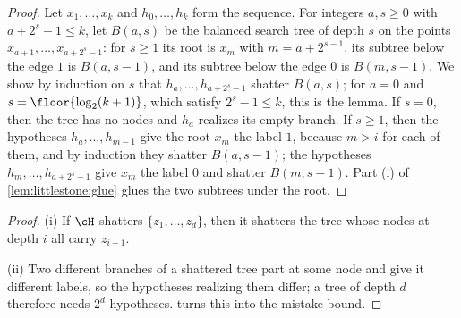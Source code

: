 \begin{refsection}

\begin{proof}
Let $x_1,\dots,x_k$ and $h_0,\dots,h_k$ form the sequence. For integers $a,s\ge0$ with $a+2^s-1\le k$, let $B(a,s)$ be the balanced search tree of depth $s$ on the points $x_{a+1},\dots,x_{a+2^s-1}$: for $s\ge1$ its root is $x_m$ with $m=a+2^{s-1}$, its subtree below the edge $1$ is $B(a,s-1)$, and its subtree below the edge $0$ is $B(m,s-1)$. We show by induction on $s$ that $h_a,\dots,h_{a+2^s-1}$ shatter $B(a,s)$; for $a=0$ and $s=\floor{\log_2(k+1)}$, which satisfy $2^s-1\le k$, this is the lemma. If $s=0$, then the tree has no nodes and $h_a$ realizes its empty branch. If $s\ge1$, then the hypotheses $h_a,\dots,h_{m-1}$ give the root $x_m$ the label $1$, because $m>i$ for each of them, and by induction they shatter $B(a,s-1)$; the hypotheses $h_m,\dots,h_{a+2^s-1}$ give $x_m$ the label $0$ and shatter $B(m,s-1)$. Part (i) of \cref{lem:littlestone:glue} glues the two subtrees under the root.
\end{proof}


\begin{proof}
(i) If $\cH$ shatters $\{z_1,\dots,z_d\}$, then it shatters the tree whose nodes at depth $i$ all carry $z_{i+1}$.

(ii) Two different branches of a shattered tree part at some node and give it different labels, so the hypotheses realizing them differ; a tree of depth $d$ therefore needs $2^d$ hypotheses.  turns this into the mistake bound.


\end{proof}
\end{refsection}
